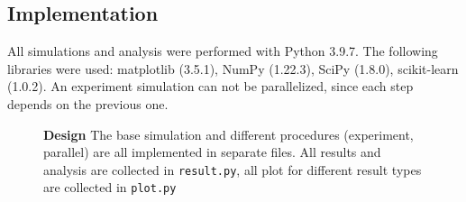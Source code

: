\documentclass[10pt]{article}
\begin{document}
\subsection{Implementation}
All simulations and analysis were performed with Python 3.9.7. 
The following libraries were used: matplotlib (3.5.1), NumPy (1.22.3), SciPy (1.8.0), scikit-learn (1.0.2). 
An experiment simulation can not be parallelized, since each step depends on the previous one.


\begin{figure}[ht]
	\vspace*{-2cm}
	\caption{\textbf{Design} The base simulation and different procedures (experiment, parallel) are all implemented in separate files. All results and analysis are collected in \texttt{result.py}, all plot for different result types are collected in \texttt{plot.py}}
\label{fig:code}
\end{figure}

\clearpage

\printbibliography
\end{document}
